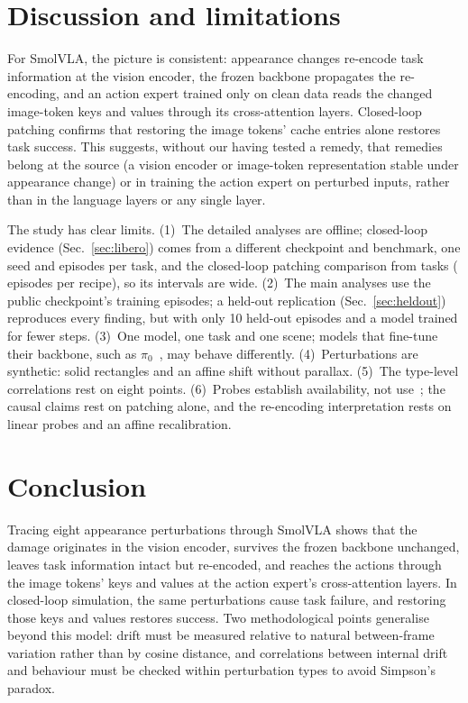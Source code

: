 \documentclass[conference]{IEEEtran}
\begin{document}
\section{Discussion and limitations}
For SmolVLA, the picture is consistent: appearance changes re-encode task information at the vision encoder, the frozen backbone propagates the re-encoding, and an action expert trained only on clean data reads the changed image-token keys and values through its cross-attention layers. Closed-loop patching confirms that restoring the image tokens' cache entries alone restores task success. This suggests, without our having tested a remedy, that remedies belong at the source (a vision encoder or image-token representation stable under appearance change) or in training the action expert on perturbed inputs, rather than in the language layers or any single layer.

The study has clear limits. (1)~The detailed analyses are offline; closed-loop evidence (Sec.~\ref{sec:libero}) comes from a different checkpoint and benchmark, one seed and \LbEps{} episodes per task, and the closed-loop patching comparison from \PTasks{} tasks (\OePairs{} episodes per recipe), so its intervals are wide. (2)~The main analyses use the public checkpoint's training episodes; a held-out replication (Sec.~\ref{sec:heldout}) reproduces every finding, but with only 10 held-out episodes and a model trained for fewer steps. (3)~One model, one task and one scene; models that fine-tune their backbone, such as $\pi_0$~\cite{black2024pi0}, may behave differently. (4)~Perturbations are synthetic: solid rectangles and an affine shift without parallax. (5)~The type-level correlations rest on eight points. (6)~Probes establish availability, not use~\cite{belinkov2022probing}; the causal claims rest on patching alone, and the re-encoding interpretation rests on linear probes and an affine recalibration.

\section{Conclusion}
Tracing eight appearance perturbations through SmolVLA shows that the damage originates in the vision encoder, survives the frozen backbone unchanged, leaves task information intact but re-encoded, and reaches the actions through the image tokens' keys and values at the action expert's cross-attention layers. In closed-loop simulation, the same perturbations cause task failure, and restoring those keys and values restores success. Two methodological points generalise beyond this model: drift must be measured relative to natural between-frame variation rather than by cosine distance, and correlations between internal drift and behaviour must be checked within perturbation types to avoid Simpson's paradox.
\end{document}
